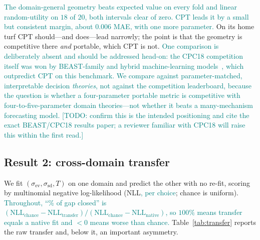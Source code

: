 \documentclass[journal]{IEEEtran}
\newcommand{\rev}[1]{\textcolor{teal}{#1}}
\begin{document}
\rev{The domain-general geometry beats expected value on every fold and linear random-utility on $18$ of $20$, both intervals clear of zero. CPT leads it by a small but consistent margin, about $0.006$ MAE, with one more parameter.}
On its home turf CPT should---and does---lead narrowly; the point is that the geometry is competitive there \emph{and} portable, which CPT is not.
\rev{One comparison is deliberately absent and should be addressed head-on: the CPC18 competition itself was won by BEAST-family and hybrid machine-learning models~\cite{plonsky2019}, which outpredict CPT on this benchmark. We compare against parameter-matched, interpretable decision \emph{theories}, not against the competition leaderboard, because the question is whether a four-parameter portable metric is competitive with four-to-five-parameter domain theories---not whether it beats a many-mechanism forecasting model. [TODO: confirm this is the intended positioning and cite the exact BEAST/CPC18 results paper; a reviewer familiar with CPC18 will raise this within the first read.]}

\subsection{Result 2: cross-domain transfer}
We fit $(\sigma_{\mathrm{ev}},\sigma_{\mathrm{sd}},T)$ on one domain and predict the other with no re-fit, scoring by multinomial negative log-likelihood (NLL\rev{, per choice}; chance is uniform).
\rev{Throughout, ``\% of gap closed'' is $(\mathrm{NLL}_{\text{chance}}-\mathrm{NLL}_{\text{transfer}})/(\mathrm{NLL}_{\text{chance}}-\mathrm{NLL}_{\text{native}})$, so $100\%$ means transfer equals a native fit and $<0$ means worse than chance.}
Table~\ref{tab:transfer} reports the raw transfer and, below it, an important asymmetry.
\end{document}
